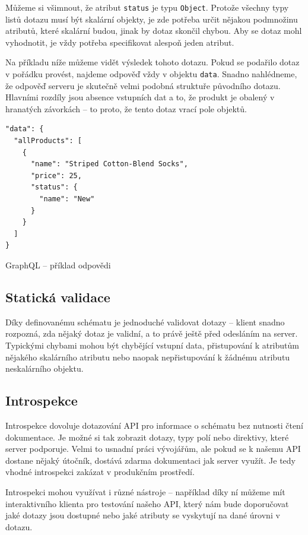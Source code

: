 \documentclass[thesis=M,czech]{FITthesis}[2019/12/23]
\begin{document}
Můžeme si všimnout, že atribut \texttt{status} je typu \texttt{Object}. Protože všechny typy listů dotazu musí být skalární objekty, je zde potřeba určit nějakou podmnožinu atributů, které skalární budou, jinak by dotaz skončil chybou. Aby se dotaz mohl vyhodnotit, je vždy potřeba specifikovat alespoň jeden atribut.

Na příkladu níže můžeme vidět výsledek tohoto dotazu. Pokud se podařilo dotaz v pořádku provést, najdeme odpověď vždy v objektu \texttt{data}. Snadno nahlédneme, že odpověď serveru je skutečně velmi podobná struktuře původního dotazu. Hlavními rozdíly jsou absence vstupních dat a to, že produkt je obalený v hranatých závorkách -- to proto, že tento dotaz vrací pole objektů.

\begin{listing}[H]
\begin{verbatim}
"data": {
  "allProducts": [
    {
      "name": "Striped Cotton-Blend Socks",
      "price": 25,
      "status": {
        "name": "New"
      }
    }
  ]
}
\end{verbatim}
\caption{GraphQL -- příklad odpovědi}
\label{lst:graphql_example_response}
\end{listing}

\subsection{Statická validace}
Díky definovanému schématu je jednoduché validovat dotazy -- klient snadno rozpozná, zda nějaký dotaz je validní, a to právě ještě před odesláním na server. Typickými chybami mohou být chybějící vstupní data, přistupování k atributům nějakého skalárního atributu nebo naopak nepřistupování k žádnému atributu neskalárního objektu.

\subsection{Introspekce}
\begin{sloppypar}
Introspekce dovoluje dotazování API pro informace o schématu bez nutnosti čtení dokumentace. Je možné si tak zobrazit dotazy, typy polí nebo direktivy, které server podporuje. Velmi to usnadní práci vývojářům, ale pokud se k našemu API dostane nějaký útočník, dostává zdarma dokumentaci jak server využít. Je tedy vhodné introspekci zakázat v produkčním prostředí.
\end{sloppypar}
Introspekci mohou využívat i různé nástroje -- například díky ní můžeme mít interaktivního klienta pro testování našeho API, který nám bude doporučovat jaké dotazy jsou dostupné  nebo jaké atributy se vyskytují na dané úrovni v dotazu.
\end{document}
